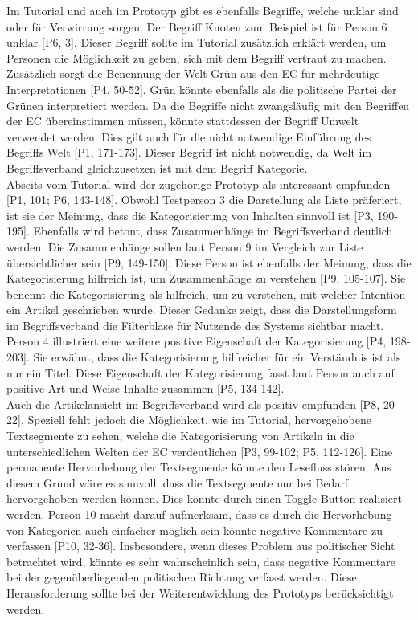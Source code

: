 Im Tutorial und auch im Prototyp gibt es ebenfalls Begriffe, welche unklar sind oder für Verwirrung sorgen.
Der Begriff Knoten zum Beispiel ist für Person 6 unklar [P6, 3].
Dieser Begriff sollte im Tutorial zusätzlich erklärt werden, um Personen die Möglichkeit zu geben, sich mit dem Begriff vertraut zu machen.
Zusätzlich sorgt die Benennung der Welt Grün aus den \ac{EC} für mehrdeutige Interpretationen [P4, 50-52].
Grün könnte ebenfalls als die politische Partei der Grünen interpretiert werden.
Da die Begriffe nicht zwangsläufig mit den Begriffen der \ac{EC} übereinstimmen müssen, könnte stattdessen der Begriff Umwelt verwendet werden.
Dies gilt auch für die nicht notwendige Einführung des Begriffs Welt [P1, 171-173].
Dieser Begriff ist nicht notwendig, da Welt im Begriffsverband gleichzusetzen ist mit dem Begriff Kategorie.\\

Abseits vom Tutorial wird der zugehörige Prototyp als interessant empfunden [P1, 101; P6, 143-148].
Obwohl Testperson 3 die Darstellung als Liste präferiert, ist sie der Meinung, dass die Kategorisierung von Inhalten sinnvoll ist [P3, 190-195].
Ebenfalls wird betont, dass Zusammenhänge im Begriffsverband deutlich werden.
Die Zusammenhänge sollen laut Person 9 im Vergleich zur Liste übersichtlicher sein [P9, 149-150].
Diese Person ist ebenfalls der Meinung, dass die Kategorisierung hilfreich ist, um Zusammenhänge zu verstehen [P9, 105-107].
Sie benennt die Kategorisierung als hilfreich, um zu verstehen, mit welcher Intention ein Artikel geschrieben wurde.
Dieser Gedanke zeigt, dass die Darstellungsform im Begriffsverband die Filterblase für Nutzende des Systems sichtbar macht.
Person 4 illustriert eine weitere positive Eigenschaft der Kategorisierung [P4, 198-203].
Sie erwähnt, dass die Kategorisierung hilfreicher für ein Verständnis ist als nur ein Titel.
Diese Eigenschaft der Kategorisierung fasst laut Person auch auf positive Art und Weise Inhalte zusammen [P5, 134-142].\\

Auch die Artikelansicht im Begriffsverband wird als positiv empfunden [P8, 20-22].
Speziell fehlt jedoch die Möglichkeit, wie im Tutorial, hervorgehobene Textsegmente zu sehen, welche die Kategorisierung von Artikeln in die unterschiedlichen Welten der \ac{EC} verdeutlichen [P3, 99-102; P5, 112-126].
Eine permanente Hervorhebung der Textsegmente könnte den Lesefluss stören.
Aus diesem Grund wäre es sinnvoll, dass die Textsegmente nur bei Bedarf hervorgehoben werden können.
Dies könnte durch einen Toggle-Button realisiert werden.
Person 10 macht darauf aufmerksam, dass es durch die Hervorhebung von Kategorien auch einfacher möglich sein könnte negative Kommentare zu verfassen [P10, 32-36].
Insbesondere, wenn dieses Problem aus politischer Sicht betrachtet wird, könnte es sehr wahrscheinlich sein, dass negative Kommentare bei der gegenüberliegenden politischen Richtung verfasst werden.
Diese Herausforderung sollte bei der Weiterentwicklung des Prototyps berücksichtigt werden.\\

